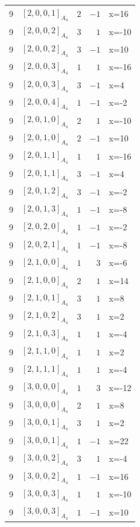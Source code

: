 \documentclass[11pt]{article}
\newcommand{\Dynkin}[1]{#1}
\begin{document}
\begin{longtable}{r l r r l}
9 & $\Dynkin{[2,0,0,1]_{A_4}}$ & $2$ & $-1$ & x=16\\
9 & $\Dynkin{[2,0,0,2]_{A_4}}$ & $3$ & $1$ & x=-10\\
9 & $\Dynkin{[2,0,0,2]_{A_4}}$ & $3$ & $-1$ & x=10\\
9 & $\Dynkin{[2,0,0,3]_{A_4}}$ & $1$ & $1$ & x=-16\\
9 & $\Dynkin{[2,0,0,3]_{A_4}}$ & $3$ & $-1$ & x=4\\
9 & $\Dynkin{[2,0,0,4]_{A_4}}$ & $1$ & $-1$ & x=-2\\
9 & $\Dynkin{[2,0,1,0]_{A_4}}$ & $2$ & $1$ & x=-10\\
9 & $\Dynkin{[2,0,1,0]_{A_4}}$ & $2$ & $-1$ & x=10\\
9 & $\Dynkin{[2,0,1,1]_{A_4}}$ & $1$ & $1$ & x=-16\\
9 & $\Dynkin{[2,0,1,1]_{A_4}}$ & $3$ & $-1$ & x=4\\
9 & $\Dynkin{[2,0,1,2]_{A_4}}$ & $3$ & $-1$ & x=-2\\
9 & $\Dynkin{[2,0,1,3]_{A_4}}$ & $1$ & $-1$ & x=-8\\
9 & $\Dynkin{[2,0,2,0]_{A_4}}$ & $1$ & $-1$ & x=-2\\
9 & $\Dynkin{[2,0,2,1]_{A_4}}$ & $1$ & $-1$ & x=-8\\
9 & $\Dynkin{[2,1,0,0]_{A_4}}$ & $1$ & $3$ & x=-6\\
9 & $\Dynkin{[2,1,0,0]_{A_4}}$ & $2$ & $1$ & x=14\\
9 & $\Dynkin{[2,1,0,1]_{A_4}}$ & $3$ & $1$ & x=8\\
9 & $\Dynkin{[2,1,0,2]_{A_4}}$ & $3$ & $1$ & x=2\\
9 & $\Dynkin{[2,1,0,3]_{A_4}}$ & $1$ & $1$ & x=-4\\
9 & $\Dynkin{[2,1,1,0]_{A_4}}$ & $1$ & $1$ & x=2\\
9 & $\Dynkin{[2,1,1,1]_{A_4}}$ & $1$ & $1$ & x=-4\\
9 & $\Dynkin{[3,0,0,0]_{A_4}}$ & $1$ & $3$ & x=-12\\
9 & $\Dynkin{[3,0,0,0]_{A_4}}$ & $2$ & $1$ & x=8\\
9 & $\Dynkin{[3,0,0,1]_{A_4}}$ & $3$ & $1$ & x=2\\
9 & $\Dynkin{[3,0,0,1]_{A_4}}$ & $1$ & $-1$ & x=22\\
9 & $\Dynkin{[3,0,0,2]_{A_4}}$ & $3$ & $1$ & x=-4\\
9 & $\Dynkin{[3,0,0,2]_{A_4}}$ & $1$ & $-1$ & x=16\\
9 & $\Dynkin{[3,0,0,3]_{A_4}}$ & $1$ & $1$ & x=-10\\
9 & $\Dynkin{[3,0,0,3]_{A_4}}$ & $1$ & $-1$ & x=10\\

\end{longtable}
\end{document}
